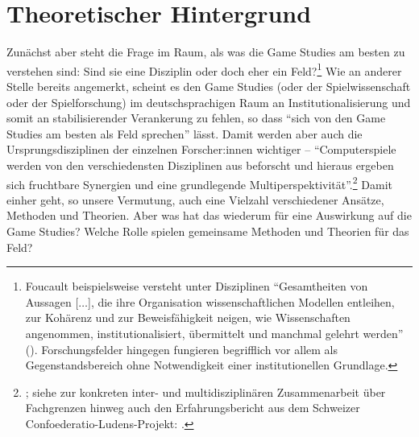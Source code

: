 \documentclass{scrartcl}
\begin{document}
\section{Theoretischer Hintergrund}\label{sec:hintergrund}
Zunächst aber steht die Frage im Raum, als was die Game Studies am besten zu verstehen sind:
Sind sie eine Disziplin oder doch eher ein Feld?\footnote{Foucault beispielsweise versteht unter Disziplinen \enquote{Gesamtheiten von Aussagen [$\ldots$], die ihre Organisation wissenschaftlichen Modellen entleihen, zur Kohärenz und zur Beweisfähigkeit neigen, wie Wissenschaften angenommen, institutionalisiert, übermittelt und manchmal gelehrt werden} (\autocite[][S.~253--254]{foucault_archaologie_2011}). Forschungsfelder hingegen fungieren begrifflich vor allem als Gegenstandsbereich ohne Notwendigkeit einer institutionellen Grundlage.}
Wie an anderer Stelle bereits angemerkt, scheint es den Game Studies (oder der Spielwissenschaft oder der Spielforschung) im deutschsprachigen Raum an Institutionalisierung und somit an stabilisierender Verankerung zu fehlen,\autocite[][S.~26]{unterhuber_wer_2024} so dass \enquote{sich von den Game Studies am besten als Feld sprechen} lässt.\autocite[][S.~26]{unterhuber_wer_2024}
Damit werden aber auch die Ursprungsdisziplinen der einzelnen Forscher:innen wichtiger -- \enquote{Computerspiele werden von den verschiedensten Disziplinen aus beforscht und hieraus ergeben sich fruchtbare Synergien und eine grundlegende Multiperspektivität}.\footnote{\autocite[][S.~26]{unterhuber_wer_2024}; siehe zur konkreten inter- und multidisziplinären Zusammenarbeit über Fachgrenzen hinweg auch den Erfahrungsbericht aus dem Schweizer Confoederatio-Ludens-Projekt: \autocite{bemelmans_bridging_2024}.}
Damit einher geht, so unsere Vermutung, auch eine Vielzahl verschiedener Ansätze, Methoden und Theorien.
Aber was hat das wiederum für eine Auswirkung auf die Game Studies?
Welche Rolle spielen gemeinsame Methoden und Theorien für das Feld?
\end{document}
